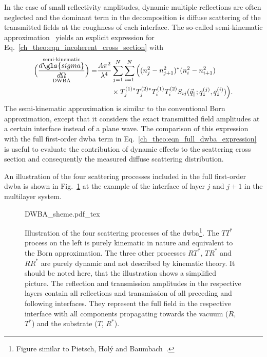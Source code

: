 In the case of small reflectivity amplitudes, dynamic multiple reflections are often neglected and the dominant term in the decomposition is diffuse scattering of the transmitted fields at the roughness of each interface. The so-called semi-kinematic approximation~\cite{sinha_x-ray_1988} yields an explicit expression for Eq.~\eqref{ch_theo:eqn_incoherent_cross_section} with
\begin{align}
                \overset{\text{semi-kinematic}}{\underset{\text{DWBA}}{\Big(\frac{d \gls{sigma}}{d \Omega}\Big)}} = &\frac{A \pi^2}{\lambda^4}\sum \limits_{j=1}^{N}\sum \limits_{i=1}^{N} \Big((n_j^2 - n_{j+1}^2)^* (n_i^2 - n_{i+1}^2) \nonumber \\ &\qquad\times T^{(1)*}_j T^{(2)*}_j T^{(1)}_i T^{(2)}_i S_{ij}(\vec{q}_\parallel; q_z^{(j)}, q_z^{(i)})\Big)\text{.} \label{ch_theo:eqn_semi_kinematic_dwba_expression} 
\end{align}
The semi-kinematic approximation is similar to the conventional Born approximation, except that it considers the exact transmitted field amplitudes at a certain interface instead of a plane wave. The comparison of this expression with the full first-order \gls{dwba} term in Eq.~\eqref{ch_theo:eqn_full_dwba_expression} is useful to evaluate the contribution of dynamic effects to the scattering cross section and consequently the measured diffuse scattering distribution.

An illustration of the four scattering processes included in the full first-order \gls{dwba} is shown in Fig.~\ref{ch_theo:fig_dwba_scheme} at the example of the interface of layer $j$ and $j+1$ in the multilayer system.
\begin{figure}[htb]
    \def\svgwidth{\textwidth}
    {DWBA_sheme.pdf_tex}
    \caption[Illustration of the four scattering processes of the DWBA.]{Illustration of the four scattering processes of the \gls{dwba}\footnote{Figure similar to Pietsch, Hol\'{y} and Baumbach~\cite{pietsch_high-resolution_2004}.}. The $T T^*$ process on the left is purely kinematic in nature and equivalent to the Born approximation. The three other processes $RT^*$, $TR^*$ and $RR^*$ are purely dynamic and not described by kinematic theory. It should be noted here, that the illustration shows a simplified picture. The reflection and transmission amplitudes in the respective layers contain all reflections and transmission of all preceding and following interfaces. They represent the full field in the respective interface with all components propagating towards the vacuum ($R$, $T^*$) and the substrate ($T$, $R^*$).}
    \label{ch_theo:fig_dwba_scheme}
\end{figure}


